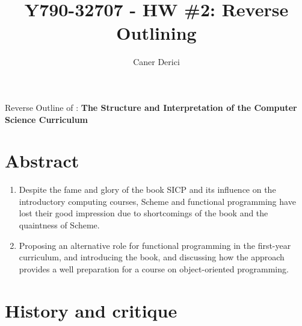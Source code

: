 \documentclass{article}
\title{Y790-32707 - HW \#2: Reverse Outlining}
\author{}
\date{Caner Derici}
\begin{document}

\maketitle



\begin{center}
  Reverse Outline of : \textbf{The Structure and Interpretation of the Computer Science Curriculum}
\end{center}

\section*{Abstract}

\begin{enumerate}
\item Despite the fame and glory of the book SICP and its influence on
  the introductory computing courses, Scheme and functional
  programming have lost their good impression due to shortcomings of
  the book and the quaintness of Scheme.
\item Proposing an alternative role for functional programming in the
  first-year curriculum, and introducing the book, and discussing how
  the approach provides a well preparation for a course on
  object-oriented programming.
\end{enumerate}

\section{History and critique}
\end{document}
